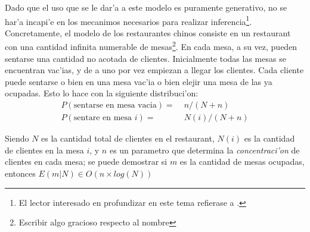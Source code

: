 Dado que el uso que se le dar'a a este modelo es puramente generativo, no se har'a incapi'e en los mecanimos necesarios para realizar inferencia\footnote{El lector interesado en profundizar en este tema refierase a \cita.}.
Concretamente, el modelo de los restaurantes chinos consiste en un restaurant con una cantidad infinita numerable de mesas\footnote{Escribir algo gracioso respecto al nombre}. 
En cada mesa, a su vez, pueden sentarse una cantidad no acotada de clientes. Inicialmente todas las mesas se encuentran vac'ias, 
y de a uno por vez empiezan a llegar los clientes. Cada cliente puede sentarse o bien en una mesa vac'ia o bien elejir una mesa de las ya ocupadas. 
Esto lo hace con la siguiente distribuci'on:
\begin{align}
P(\text{sentarse en mesa vacia}) =&\; n/(N + n)\\
P(\text{sentare en mesa } i) =&\; N(i)/(N + n)
\end{align}

Siendo $N$ es la cantidad total de clientes en el restaurant, $N(i)$ es la cantidad de clientes en la mesa $i$, y $n$ es un 
parametro que determina la \emph{concentraci'on} de clientes en cada mesa; se puede demostrar si $m$ es la cantidad de mesas ocupadas, entonces
$E(m|N) \in O(n\times log(N))$ 

